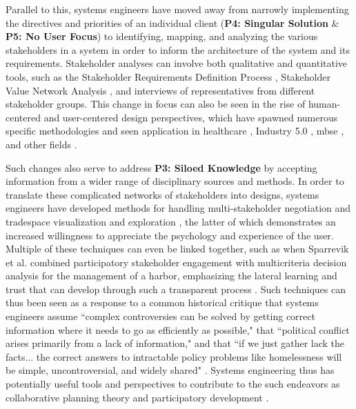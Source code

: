 Parallel to this, systems engineers have moved away from narrowly implementing the directives and priorities of an individual client (\textbf{P4: Singular Solution} \& \textbf{P5: No User Focus}) to identifying, mapping, and analyzing the various stakeholders in a system in order to inform the architecture of the system and its requirements. Stakeholder analyses can involve both qualitative and quantitative tools, such as the Stakeholder Requirements Definition Process \cite{incoseINCOSESystemsEngineering2015}, Stakeholder Value Network Analysis \cite{fengDependencyStructureMatrix2010a}, and interviews of representatives from different stakeholder groups. This change in focus can also be seen in the rise of human-centered and user-centered design perspectives, which have spawned numerous specific methodologies and seen application in healthcare \cite{samarasSystemsEngineeringPerspective2005}, Industry 5.0 \cite{longoValueOrientedEthicalTechnology2020}, \ac{mbse} \cite{kimChallengesApplyingModelbased2019}, and other fields \cite{ritterFoundationsDesigningUserCentered2014}.

Such changes also serve to address \textbf{P3: Siloed Knowledge} by accepting information from a wider range of disciplinary sources and methods. In order to translate these complicated networks of stakeholders into designs, systems engineers have developed methods for handling multi-stakeholder negotiation and \cite{fitzgeraldEffectsEnhancedMultiparty2015,fitzgeraldRecommendationsFramingMultistakeholder2016,weckMULTISTAKEHOLDERSIMULATIONGAMING2012} tradespace visualization and exploration \cite{fitzgeraldEffectsEnhancedMultiparty2015,fitzgeraldRecommendationsFramingMultistakeholder2016,groganInteractiveModelsSystem2015,rossMultiAttributeTradespaceExploration2004,selvavaleroRulebasedSystemArchitecting2012}, the latter of which demonstrates an increased willingness to appreciate the psychology and experience of the user. Multiple of these techniques can even be linked together, such as when Sparrevik et al. combined participatory stakeholder engagement with multicriteria decision analysis for the management of a harbor, emphasizing the lateral learning and trust that can develop through such a transparent process \cite{sparrevikUseMulticriteriaInvolvement2011}. Such techniques can thus been seen as a response to a common historical critique that systems engineers assume ``complex controversies can be solved by getting correct information where it needs to go as efficiently as possible," that ``political conflict arises primarily from a lack of information," and that ``if we just gather lack the facts... the correct answers to intractable policy problems like homelessness will be simple, uncontroversial, and widely shared" \cite[\textsuperscript{(p124)}]{eubanksAutomatingInequalityHow2018}. Systems engineering thus has potentially useful tools and perspectives to contribute to the such endeavors as collaborative planning theory \cite{goodspeedDeathLifeCollaborative2016} and participatory development \cite{pertParticipatoryDevelopmentNew2013}.

